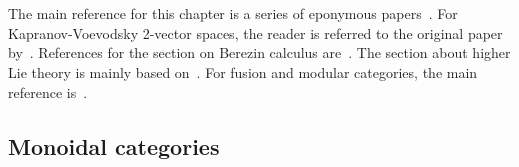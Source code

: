 \chapter{}\label{chapter:hda}

    The main reference for this chapter is a series of eponymous papers~\citep{baez_higher-dimensional_2003, baez_higher-dimensional_2003-1}. For Kapranov-Voevodsky 2-vector spaces, the reader is referred to the original paper by~\citet{kapranov_2-categories_1994}. References for the section on Berezin calculus are~\citet{losev_berezin_2007, choquet-bruhat_analysis_2000}. The section about higher Lie theory is mainly based on~\citet{fiorenza_introduction_2004}. For fusion and modular categories, the main reference is~\citet{etingof_tensor_2016}.

\section{Monoidal categories}\label{section:monoidal_categories}

